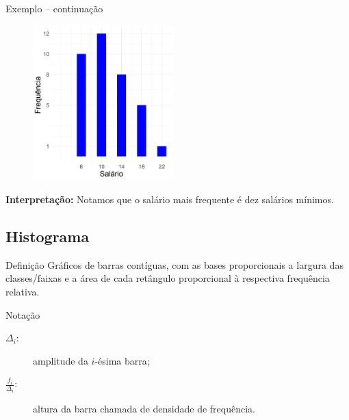 \documentclass[9pt]{beamer}
\begin{document}
\begin{frame}{Exemplo -- continuação}
  \begin{figure}
   \centering
   \includegraphics[height=6cm]{salario_bar.png}
  \end{figure}
  
  \textbf{Interpretação:} Notamos que o salário mais frequente é dez salários mínimos.
\end{frame}

\subsection{Histograma}

\begin{frame}{}
 \begin{block}{Definição}
  Gráficos de barras contíguas, com as bases proporcionais a largura das classes/faixas e a área de cada retângulo proporcional à respectiva frequência relativa.
 \end{block}
 
 \begin{block}{Notação}
  \begin{description}
   \item[$\Delta_i:$] amplitude da $i$-ésima barra;
   \item[$\frac{f_i}{\Delta_i}:$] altura da barra chamada de densidade de frequência.
  \end{description}
 \end{block}
 
 \begin{figure}
  \centering

 \end{figure}

\end{frame}
\end{document}
